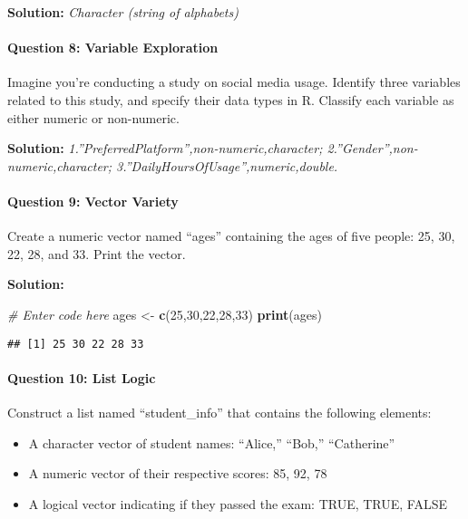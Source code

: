\documentclass[
]{article}
\newenvironment{Shaded}{\begin{snugshade}}{\end{snugshade}}
\newcommand{\CommentTok}[1]{\textcolor[rgb]{0.56,0.35,0.01}{\textit{#1}}}
\newcommand{\DecValTok}[1]{\textcolor[rgb]{0.00,0.00,0.81}{#1}}
\newcommand{\FunctionTok}[1]{\textcolor[rgb]{0.13,0.29,0.53}{\textbf{#1}}}
\newcommand{\NormalTok}[1]{#1}
\newcommand{\OtherTok}[1]{\textcolor[rgb]{0.56,0.35,0.01}{#1}}
\begin{document}
\textbf{Solution:} \emph{Character (string of alphabets)}

\hypertarget{question-8-variable-exploration}{%
\paragraph{Question 8: Variable
Exploration}\label{question-8-variable-exploration}}

Imagine you're conducting a study on social media usage. Identify three
variables related to this study, and specify their data types in R.
Classify each variable as either numeric or non-numeric.

\textbf{Solution:} \emph{1.''PreferredPlatform'',non-numeric,character;
2.''Gender'',non-numeric,character;
3.''DailyHoursOfUsage'',numeric,double.}

\hypertarget{question-9-vector-variety}{%
\paragraph{Question 9: Vector Variety}\label{question-9-vector-variety}}

Create a numeric vector named ``ages'' containing the ages of five
people: 25, 30, 22, 28, and 33. Print the vector.

\textbf{Solution:}

\begin{Shaded}
\begin{Highlighting}[]
\CommentTok{\# Enter code here}
\NormalTok{ages }\OtherTok{\textless{}{-}} \FunctionTok{c}\NormalTok{(}\DecValTok{25}\NormalTok{,}\DecValTok{30}\NormalTok{,}\DecValTok{22}\NormalTok{,}\DecValTok{28}\NormalTok{,}\DecValTok{33}\NormalTok{)}
\FunctionTok{print}\NormalTok{(ages)}
\end{Highlighting}
\end{Shaded}

\begin{verbatim}
## [1] 25 30 22 28 33
\end{verbatim}

\hypertarget{question-10-list-logic}{%
\paragraph{Question 10: List Logic}\label{question-10-list-logic}}

Construct a list named ``student\_info'' that contains the following
elements:

\begin{itemize}
\item
  A character vector of student names: ``Alice,'' ``Bob,'' ``Catherine''
\item
  A numeric vector of their respective scores: 85, 92, 78
\item
  A logical vector indicating if they passed the exam: TRUE, TRUE, FALSE
\end{itemize}
\end{document}

